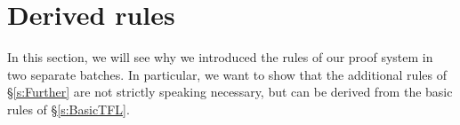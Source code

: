 \chapter{Derived rules}\label{s:Derived}

In this section, we will see why we introduced the rules of our proof system in two separate batches. In particular, we want to show that the additional rules of \S\ref{s:Further} are not strictly speaking necessary, but can be derived from the basic rules of \S\ref{s:BasicTFL}.

%
%
%

